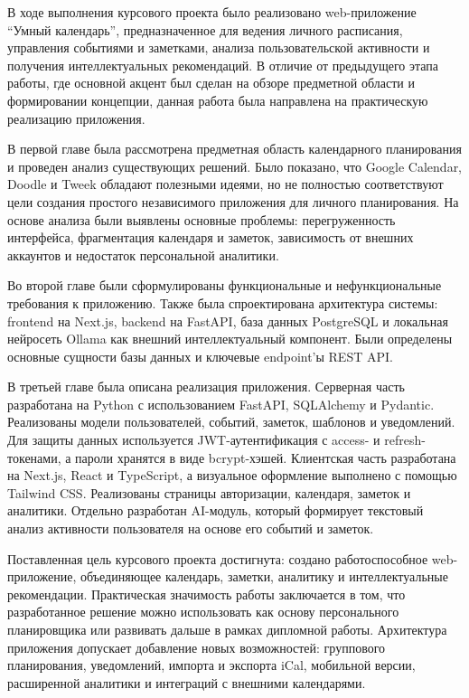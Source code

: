 \documentclass[14pt,a4paper]{extreport}
\begin{document}
В ходе выполнения курсового проекта было реализовано web-приложение ``Умный календарь'', предназначенное для ведения личного расписания, управления событиями и заметками, анализа пользовательской активности и получения интеллектуальных рекомендаций. В отличие от предыдущего этапа работы, где основной акцент был сделан на обзоре предметной области и формировании концепции, данная работа была направлена на практическую реализацию приложения.

В первой главе была рассмотрена предметная область календарного планирования и проведен анализ существующих решений. Было показано, что Google Calendar, Doodle и Tweek обладают полезными идеями, но не полностью соответствуют цели создания простого независимого приложения для личного планирования. На основе анализа были выявлены основные проблемы: перегруженность интерфейса, фрагментация календаря и заметок, зависимость от внешних аккаунтов и недостаток персональной аналитики.

Во второй главе были сформулированы функциональные и нефункциональные требования к приложению. Также была спроектирована архитектура системы: frontend на Next.js, backend на FastAPI, база данных PostgreSQL и локальная нейросеть Ollama как внешний интеллектуальный компонент. Были определены основные сущности базы данных и ключевые endpoint'ы REST API.

В третьей главе была описана реализация приложения. Серверная часть разработана на Python с использованием FastAPI, SQLAlchemy и Pydantic. Реализованы модели пользователей, событий, заметок, шаблонов и уведомлений. Для защиты данных используется JWT-аутентификация с access- и refresh-токенами, а пароли хранятся в виде bcrypt-хэшей. Клиентская часть разработана на Next.js, React и TypeScript, а визуальное оформление выполнено с помощью Tailwind CSS. Реализованы страницы авторизации, календаря, заметок и аналитики. Отдельно разработан AI-модуль, который формирует текстовый анализ активности пользователя на основе его событий и заметок.

Поставленная цель курсового проекта достигнута: создано работоспособное web-приложение, объединяющее календарь, заметки, аналитику и интеллектуальные рекомендации. Практическая значимость работы заключается в том, что разработанное решение можно использовать как основу персонального планировщика или развивать дальше в рамках дипломной работы. Архитектура приложения допускает добавление новых возможностей: группового планирования, уведомлений, импорта и экспорта iCal, мобильной версии, расширенной аналитики и интеграций с внешними календарями.
\end{document}
